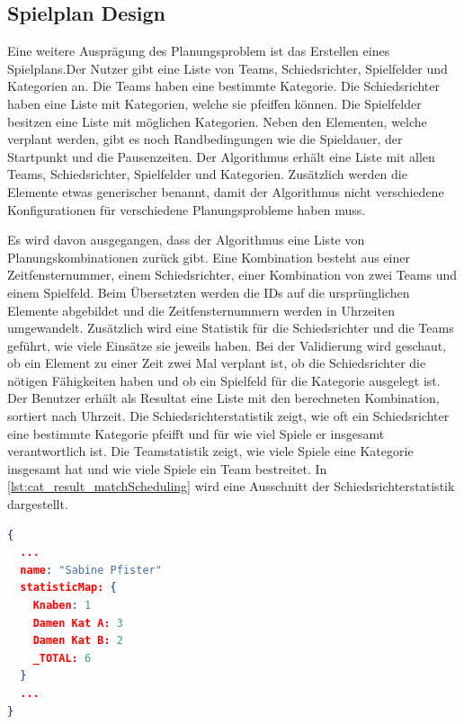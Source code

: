 %
%
%
%

\subsection{Spielplan Design}
Eine weitere Ausprägung des Planungsproblem ist das Erstellen eines Spielplans.Der Nutzer gibt eine Liste von Teams, Schiedsrichter, Spielfelder und Kategorien an. Die Teams haben eine 
bestimmte Kategorie. Die Schiedsrichter haben eine Liste mit Kategorien, welche sie pfeiffen können. Die Spielfelder besitzen eine Liste mit möglichen Kategorien. Neben den Elementen, welche 
verplant werden, gibt es noch Randbedingungen wie die Spieldauer, der Startpunkt und die Pausenzeiten. Der Algorithmus erhält eine Liste mit allen Teams, Schiedsrichter, Spielfelder und 
Kategorien. Zusätzlich werden die Elemente etwas generischer benannt, damit der Algorithmus nicht verschiedene Konfigurationen für verschiedene Planungsprobleme haben muss.

Es wird davon ausgegangen, dass der Algorithmus eine Liste von Planungskombinationen zurück gibt. Eine Kombination besteht aus einer Zeitfensternummer, einem Schiedsrichter, 
einer Kombination von zwei Teams und einem Spielfeld. Beim Übersetzten werden die IDs auf die ursprünglichen Elemente abgebildet und die Zeitfensternummern werden in Uhrzeiten 
umgewandelt. Zusätzlich wird eine Statistik für die Schiedsrichter und die Teams geführt, wie viele Einsätze sie jeweils haben. Bei der Validierung wird geschaut, ob ein Element zu einer Zeit zwei 
Mal verplant ist, ob die Schiedsrichter die nötigen Fähigkeiten haben und ob ein Spielfeld für die Kategorie ausgelegt ist. Der Benutzer erhält als Resultat eine Liste mit den berechneten 
Kombination, sortiert nach Uhrzeit. Die Schiedsrichterstatistik zeigt, wie oft ein Schiedsrichter eine bestimmte Kategorie pfeifft und für wie viel Spiele er insgesamt verantwortlich ist. Die 
Teamstatistik zeigt, wie viele Spiele eine Kategorie insgesamt hat und wie viele Spiele ein Team bestreitet. In \autoref{lst:cat_result_matchScheduling} wird eine Ausschnitt der 
Schiedsrichterstatistik dargestellt.

\begin{lstlisting}[language=JSON, caption=Ausschnitt eines Resultats einer Spielplan Erstellung, label=lst:cat_result_matchScheduling]  
{
  ...
  name: "Sabine Pfister"
  statisticMap: {
    Knaben: 1
    Damen Kat A: 3
    Damen Kat B: 2
    _TOTAL: 6
  }
  ...
}
\end{lstlisting}

